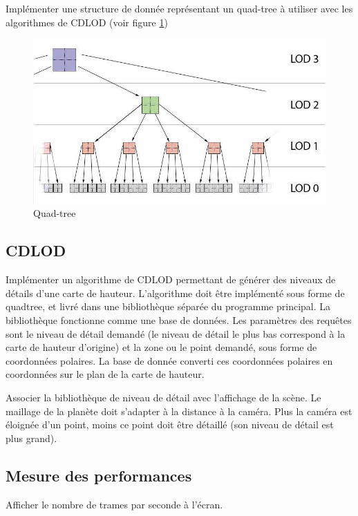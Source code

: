 \documentclass[12pt]{report}
\begin{document}
Implémenter une structure de donnée représentant un quad-tree à utiliser avec les algorithmes de CDLOD (voir figure \ref{fig:quadtree})

\begin{figure}[!ht]
  \includegraphics[scale=0.5]{img/Quadtree.png}
  \caption{Quad-tree}
  \label{fig:quadtree}
\end{figure}

\subsection{CDLOD}

Implémenter un algorithme de CDLOD permettant de générer des niveaux de détails d'une carte de hauteur. L'algorithme doit être implémenté sous forme de quadtree, et livré dans une bibliothèque séparée du programme principal. La bibliothèque fonctionne comme une base de données. Les paramètres des requêtes sont le niveau de détail demandé (le niveau de détail le plus bas correspond à la carte de hauteur d'origine) et la zone ou le point demandé, sous forme de coordonnées polaires. La base de donnée converti ces coordonnées polaires en coordonnées sur le plan de la carte de hauteur.

Associer la bibliothèque de niveau de détail avec l'affichage de la scène. Le maillage de la planète doit s'adapter à la distance à la caméra. Plus la caméra est éloignée d'un point, moins ce point doit être détaillé (son niveau de détail est plus grand).

\subsection{Mesure des performances}

Afficher le nombre de trames par seconde à l'écran.
\end{document}
